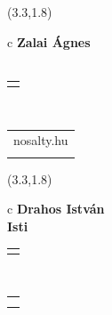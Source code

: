 \documentclass[11pt]{article}
\begin{document}
\makebox(3.3,1.8){
  \renewcommand\arraystretch{1.3}
  \begin{tabular}[c]{c}
    \hspace{8.5mm}
    \LARGE\bf{ Zalai Ágnes }\\
    \hspace{8.5mm}
    \Large{  }\\
    \renewcommand\arraystretch{3}
    \begin{tabular}[c]{c}
      \centering
      \fontfamily{phv}\selectfont{
        \textbf{
          \textsc{
            \scriptsize{
            \color{Dark}{ Ismerkedő }\color{Bright}{ Webmester }\color{Bright}{ Sminkmester }\color{Bright}{ Programozó }
            }
          }
        }
      }
    \end{tabular}
    \\
    \renewcommand\arraystretch{1}
    \begin{tabular}{p{3.3in}}
      \hspace{.7cm}nosalty.hu\\
      \hspace{.7cm}\emph{  }\\
    \end{tabular}
  \end{tabular}
}

\makebox(3.3,1.8){
  \renewcommand\arraystretch{1.3}
  \begin{tabular}[c]{c}
    \hspace{8.5mm}
    \LARGE\bf{ Drahos István }\\
    \hspace{8.5mm}
    \Large{ Isti }\\
    \renewcommand\arraystretch{3}
    \begin{tabular}[c]{c}
      \centering
      \fontfamily{phv}\selectfont{
        \textbf{
          \textsc{
            \scriptsize{
            \color{Bright}{ Ismerkedő }\color{Bright}{ Webmester }\color{Bright}{ Sminkmester }\color{Dark}{ Programozó }
            }
          }
        }
      }
    \end{tabular}
    \\
    \renewcommand\arraystretch{1}
    \begin{tabular}{p{3.3in}}
      \hspace{.7cm}\\
      \hspace{.7cm}\emph{  }\\
    \end{tabular}
  \end{tabular}
}
\end{document}
